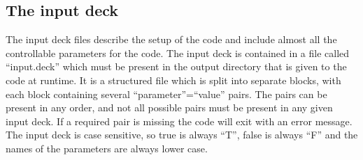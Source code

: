 \documentclass[12pt,a4paper]{article}
\newcommand{\EPOCH}{{\color{warwickdark}\fontfamily{phv}\selectfont{EPOCH}}}
\begin{document}
\subsection{The {\EPOCH} input deck}
The input deck files describe the setup of the code and
include almost all the controllable parameters for the code. The input deck is
contained in a file called ``input.deck'' which must be present in the output
directory that is given to the code at runtime. It is a structured
file which is split into separate blocks, with each block containing several
``parameter''=``value'' pairs. The pairs can be present in any order, and not
all possible pairs must be present in any given input deck. If a required pair
is missing the code will exit with an error message. The input deck is case
sensitive, so true is always ``T'', false is always ``F'' and the names of
the parameters are always lower case.\\
\end{document}
